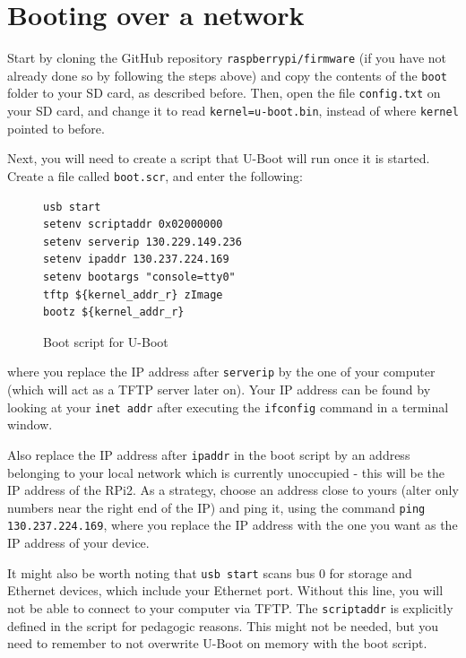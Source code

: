 \documentclass[a4paper,11pt,reqno]{amsart}
\begin{document}
{\section{Booting over a network}
Start by cloning the GitHub repository \texttt{raspberrypi/firmware} (if you have not already done so by following the steps above) and copy the contents of the \texttt{boot} folder to your SD card, as described before. Then, open the file \texttt{config.txt} on your SD card, and change it to read \texttt{kernel=u-boot.bin}, instead of where \texttt{kernel} pointed to before.

Next, you will need to create a script that U-Boot will run once it is started. Create a file called \texttt{boot.scr}, and enter the following:

\begin{figure}[hb]
\begin{center}
\begin{BVerbatim}
usb start
setenv scriptaddr 0x02000000
setenv serverip 130.229.149.236
setenv ipaddr 130.237.224.169
setenv bootargs "console=tty0"
tftp ${kernel_addr_r} zImage
bootz ${kernel_addr_r}
\end{BVerbatim}
\end{center}
\caption{Boot script for U-Boot}
\label{fig:boots}
\end{figure}

where you replace the IP address after \texttt{serverip} by the one of your computer (which will act as a TFTP server later on). Your IP address can be found by looking at your \texttt{inet addr} after executing the \texttt{ifconfig} command in a terminal window.

Also replace the IP address after \texttt{ipaddr} in the boot script by an address belonging to your local network which is currently unoccupied - this will be the IP address of the RPi2. As a strategy, choose an address close to yours (alter only numbers near the right end of the IP) and ping it, using the command \texttt{ping 130.237.224.169}, where you replace the IP address with the one you want as the IP address of your device.

It might also be worth noting that \texttt{usb start} scans bus 0 for storage and Ethernet devices, which include your Ethernet port. Without this line, you will not be able to connect to your computer via TFTP. The \texttt{scriptaddr} is explicitly defined in the script for pedagogic reasons. This might not be needed, but you need to remember to not overwrite U-Boot on memory with the boot script. 

}
\end{document}
